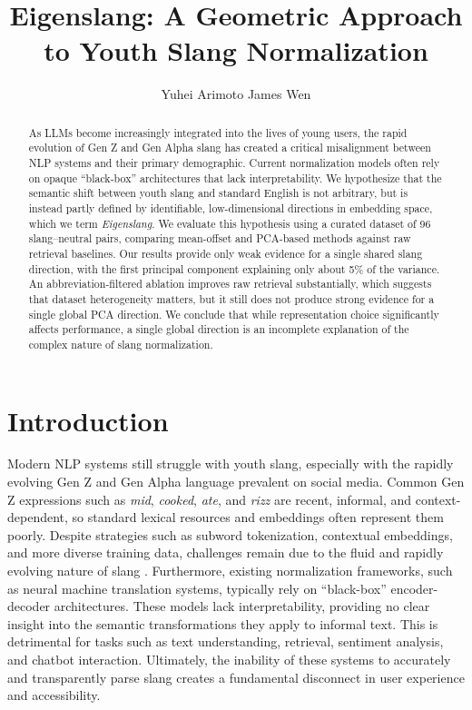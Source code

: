 \documentclass{article}
\title{Eigenslang: A Geometric Approach to Youth Slang Normalization}
\author{%
  Yuhei Arimoto
  \And
  James Wen
}
\begin{document}
\maketitle

\begin{abstract}
As LLMs become increasingly integrated into the lives of young users, the rapid evolution of Gen Z and Gen Alpha slang has created a critical misalignment between NLP systems and their primary demographic. Current normalization models often rely on opaque ``black-box'' architectures that lack interpretability. We hypothesize that the semantic shift between youth slang and standard English is not arbitrary, but is instead partly defined by identifiable, low-dimensional directions in embedding space, which we term \emph{Eigenslang}. We evaluate this hypothesis using a curated dataset of 96 slang--neutral pairs, comparing mean-offset and PCA-based methods against raw retrieval baselines. Our results provide only weak evidence for a single shared slang direction, with the first principal component explaining only about 5\% of the variance.
An abbreviation-filtered ablation improves raw retrieval substantially, which suggests that dataset heterogeneity matters, but it still does not produce strong evidence for a single global PCA direction. We conclude that while representation choice significantly affects performance, a single global direction is an incomplete explanation of the complex nature of slang normalization.
\end{abstract}

\section{Introduction}
Modern NLP systems still struggle with youth slang, especially with the rapidly evolving Gen Z and Gen Alpha language prevalent on social media. Common Gen Z expressions such as \textit{mid}, \textit{cooked}, \textit{ate}, and \textit{rizz} are recent, informal, and context-dependent, so standard lexical resources and embeddings often represent them poorly. Despite strategies such as subword tokenization, contextual embeddings, and more diverse training data, challenges remain due to the fluid and rapidly evolving nature of slang \citep{ishita-mamidi-2025-evolution}. Furthermore, existing normalization frameworks, such as neural machine translation systems, typically rely on ``black-box'' encoder-decoder architectures. These models lack interpretability, providing no clear insight into the semantic transformations they apply to informal text. This is detrimental for tasks such as text understanding, retrieval, sentiment analysis, and chatbot interaction. Ultimately, the inability of these systems to accurately and transparently parse slang creates a fundamental disconnect in user experience and accessibility.
\end{document}

